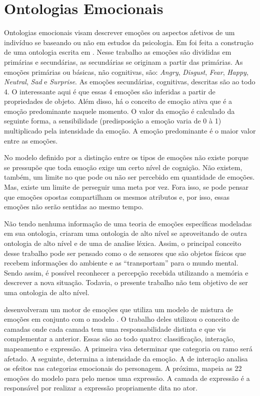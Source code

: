 \section{Ontologias Emocionais} \label{cap:eda:oe}

Ontologias emocionais visam descrever emoções ou aspectos afetivos de um
indivíduo se baseando ou não em estudos da psicologia. Em
\citet{benta2007ontology} foi feita a construção de uma ontologia escrita em
\OWL. Nesse trabalho as emoções são divididas em primárias e secundárias, as
secundárias se originam a partir das primárias. As emoções primárias ou
básicas, não cognitivas, são: \emph{Angry}, \emph{Disgust}, \emph{Fear},
\emph{Happy}, \emph{Neutral}, \emph{Sad} e \emph{Surprise}. As emoções
secundárias, cognitivas, descritas são ao todo 4. O interessante aqui é que
essas 4 emoções são inferidas a partir de propriedades de objeto. Além disso,
há o conceito de emoção ativa que é a emoção predominante naquele momento. O
valor da emoção é calculado da seguinte forma, a sensibilidade (predisposição
a emoção varia de 0 à 1) multiplicado pela intensidade da emoção. A emoção
predominante é o maior valor entre as emoções.

No modelo definido por \citet{ortony1988cse} a distinção entre os tipos de
emoções não existe porque se pressupõe que toda emoção exige um certo nível de
cognição. Não existem, também, um limite no que pode ou não ser percebido em
quantidade de emoções. Mas, existe um limite de perseguir uma meta por vez.
Fora isso, se pode pensar que emoções opostas compartilham os mesmos atributos
e, por isso, essas emoções não serão sentidas ao mesmo tempo.

Não tendo nenhuma informação de uma teoria de emoções específicas modeladas em
sua ontologia, \citet{wks2008towards} criaram uma ontologia de alto nível se
aproveitando de outra ontologia de alto nível e de uma de analise léxica.
Assim, o principal conceito desse trabalho pode ser pensado como o de sensores
que são objetos físicos que recebem informações do ambiente e as
``transportam'' para o mundo mental. Sendo assim, é possível reconhecer a
percepção recebida utilizando a memória e descrever a nova situação. Todavia,
o presente trabalho não tem objetivo de ser uma ontologia de alto
nível\dev{}.

\citet{springerlink:10.1007/978-3-642-01639-448} desenvolveram um motor de
emoções que utiliza um modelo de mistura de emoções em conjunto com o modelo
\occ. O trabalho deles utilizou o conceito de camadas onde cada camada tem uma
responsabilidade distinta e que vis complementar a anterior. Essas são ao todo
quatro: classificação, interação, mapeamento e expressão. A primeira visa
determinar que categoria ou ramo será afetado. A seguinte, determina a
intensidade da emoção. A de interação analisa os efeitos nas categorias
emocionais do personagem. A próxima, mapeia as 22 emoções do modelo para pelo
menos uma expressão. A camada de expressão é a responsável por realizar a
expressão propriamente dita no ator.


